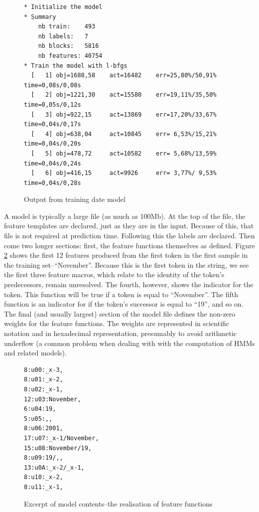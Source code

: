 \documentclass[11pt, oneside]{scrartcl}   	%
\begin{document}
\begin{figure}
\begin{verbatim}
* Initialize the model
* Summary
    nb train:    493
    nb labels:   7
    nb blocks:   5816
    nb features: 40754
* Train the model with l-bfgs
  [   1] obj=1688,58    act=16482    err=25,80%/50,91% time=0,08s/0,08s
  [   2] obj=1221,30    act=15580    err=19,11%/35,50% time=0,05s/0,12s
  [   3] obj=922,15     act=13869    err=17,20%/33,67% time=0,04s/0,17s
  [   4] obj=638,04     act=10845    err= 6,53%/15,21% time=0,04s/0,20s
  [   5] obj=478,72     act=10582    err= 5,68%/13,59% time=0,04s/0,24s
  [   6] obj=416,15     act=9926     err= 3,77%/ 9,53% time=0,04s/0,28s
\end{verbatim}
\caption{Output from training date model}
\label{fig:output}
\end{figure}

A model is typically a large file (as much as 100Mb). At the top of the file, the feature templates are declared, just as they are in the input. Because of this, that file is not required at prediction time. Following this the labels are declared. Then come two longer sections: first, the feature functions themselves as defined. Figure \ref{fig:model} shows the first 12 features produced from the first token in the first sample in the training set--``November''. Because this is the first token in the string, we see the first three feature macros, which relate to the identity of the token's predecessors, remain unresolved. The fourth, however, shows the indicator for the token. This function will be true if a token is equal to ``November''. The fifth function is an indicator for if the token's successor is equal to ``19'', and so on. The final (and usually largest) section of the model file defines the non-zero weights for the feature functions. The weights are represented in scientific notation and in hexadecimal representation, presumably to avoid arithmetic underflow (a common problem when dealing with with the computation of HMMs and related models).

\begin{figure}
\begin{verbatim}
8:u00:_x-3,
8:u01:_x-2,
8:u02:_x-1,
12:u03:November,
6:u04:19,
5:u05:,,
8:u06:2001,
17:u07:_x-1/November,
15:u08:November/19,
8:u09:19/,,
13:u0A:_x-2/_x-1,
8:u10:_x-2,
8:u11:_x-1,
\end{verbatim}
\caption{Excerpt of model contents--the realisation of feature functions}
\label{fig:model}
\end{figure}
\end{document}
